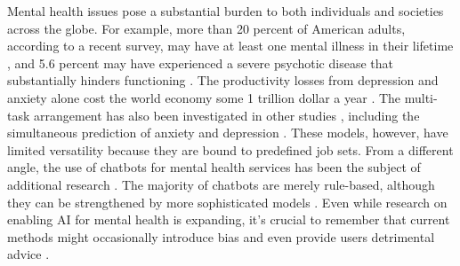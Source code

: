 Mental health issues pose a substantial burden to both individuals and societies across the globe. For example, more than 20 percent of American adults, according to a recent survey, may have at least one mental illness in their lifetime \cite{mha2022state}, and 5.6 percent may have experienced a severe psychotic disease that substantially hinders functioning \cite{nimh2023mental}. The productivity losses from depression and anxiety alone cost the world economy some 1 trillion dollar a year \cite{nami2023mental}. The multi-task arrangement has also been investigated in other studies \cite{benton2017multitask}, including the simultaneous prediction of anxiety and depression \cite{sarkar2022predicting}. These models, however, have limited versatility because they are bound to predefined job sets. From a different angle, the use of chatbots for mental health services has been the subject of additional research \cite{cameron2017towards}. The majority of chatbots are merely rule-based, although they can be strengthened by more sophisticated models \cite{abd-alrazaq2019overview}. Even while research on enabling AI for mental health is expanding, it's crucial to remember that current methods might occasionally introduce bias and even provide users detrimental advice \cite{chen2019can}.

